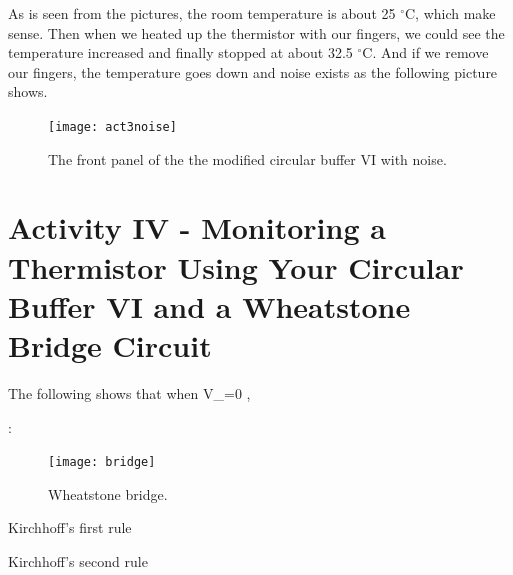\documentclass[11pt]{article}
\begin{document}
{{{{As is seen from the pictures, the room temperature is about 25 $^{\circ}$C, which make sense. Then when we heated up the thermistor with our fingers, we could see the temperature increased and finally stopped at about 32.5 $^{\circ}$C. And if we remove our fingers, the temperature goes down and noise exists as the following picture shows.

\begin{figure}[H]
 \begin{center}
  \texttt{[image: act3noise]}
  \caption{The front panel of the the modified circular buffer VI with noise.}
  \label{fig:act3noise}
 \end{center}
\end{figure}

\section{Activity IV - Monitoring a Thermistor Using Your Circular Buffer VI and a Wheatstone Bridge Circuit}

The following shows that when {\displaystyle V_{}=0} , {} 

{} :

\begin{figure}[H]
 \begin{center}
  \texttt{[image: bridge]}
  \caption{Wheatstone bridge.}
  \label{fig:bridge}
 \end{center}
\end{figure}

 Kirchhoff's first rule \Rightarrow
 
 {} 
 
 Kirchhoff's second rule \Rightarrow
 
 {}
 
}}}}
\end{document}

